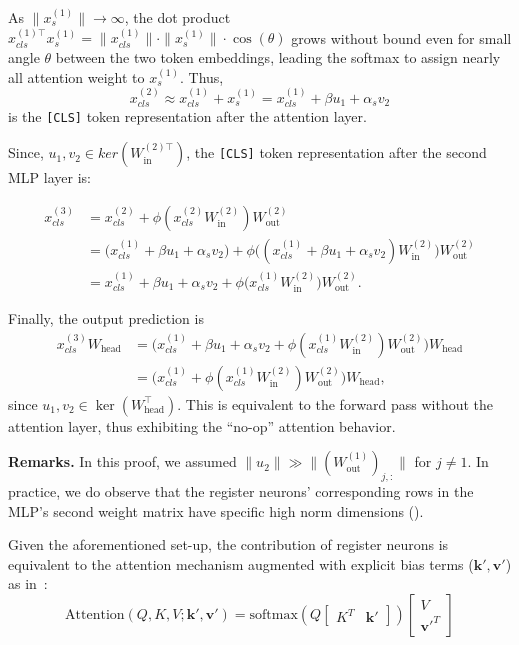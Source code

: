 \documentclass{article}
\begin{document}
As \( \|x^{(1)}_{s}\| \to \infty \), the dot product $x^{(1)\top}_{cls} x^{(1)}_{s} = \|x^{(1)}_{cls}\| \cdot \|x^{(1)}_{s}\| \cdot \cos(\theta)$
grows without bound even for small angle \( \theta \) between the two token embeddings, leading the softmax to assign nearly all attention weight to \( x^{(1)}_{s} \). Thus, 
\begin{equation}
    x^{(2)}_{cls} \approx x^{(1)}_{cls} + x^{(1)}_{s} = x^{(1)}_{cls} + \beta u_1+\alpha_sv_2
    \label{attention_eq}
\end{equation} is the \texttt{[CLS]} token representation after the attention layer. 


Since, $u_1, v_2 \in ker(W_{\text{in}}^{(2)\top})$, the \texttt{[CLS]} token representation after the second MLP layer is:

\begin{align}
    x^{(3)}_{cls} 
    &= x^{(2)}_{cls}+\phi\!\left(x^{(2)}_{cls}W_{\text{in}}^{(2)}\right)W_{\text{out}}^{(2)} \\
    &= \big(x^{(1)}_{cls} + \beta u_1+\alpha_sv_2\big) 
       + \phi \big((x^{(1)}_{cls} + \beta u_1+\alpha_sv_2)W_{\text{in}}^{(2)}\big)W_{\text{out}}^{(2)} \\
    &= x^{(1)}_{cls} + \beta u_1+\alpha_sv_2 
       + \phi \big(x^{(1)}_{cls}W_{\text{in}}^{(2)}\big)W_{\text{out}}^{(2)}.
\end{align}

Finally, the output prediction is
\begin{align}
    x^{(3)}_{cls}W_{\text{head}} 
    &= \big(x^{(1)}_{cls} + \beta u_1 + \alpha_s v_2 
       + \phi (x^{(1)}_{cls}W_{\text{in}}^{(2)})W_{\text{out}}^{(2)}\big) W_{\text{head}} \\
    &= \big(x^{(1)}_{cls} 
       + \phi (x^{(1)}_{cls}W_{\text{in}}^{(2)})W_{\text{out}}^{(2)}\big) W_{\text{head}},
\end{align}
since $u_1, v_2 \in \ker(W^\top_{\text{head}})$. 
This is equivalent to the forward pass without the attention layer, 
thus exhibiting the ``no-op'' attention behavior.

\textbf{Remarks.} In this proof, we assumed $\|u_2\|
 \gg\|(W_{\text{out}}^{(1)})_{j,:}\|$ for $j \neq 1$. In practice, we do observe that the register neurons' corresponding rows in the MLP's second weight matrix have specific high norm dimensions ().


\renewcommand\thecorollary{1} %
\begin{corollary}
\label{corollary:register_bias}
Given the aforementioned set-up, the contribution of register neurons is equivalent to the attention mechanism augmented with explicit bias terms  ($\mathbf{k}', \mathbf{v}'$) as in~\cite{sunmassive}: $$\text{Attention}(Q, K, V; \mathbf{k}', \mathbf{v}') = \text{softmax}\left( Q \begin{bmatrix} K^T & \mathbf{k}' \end{bmatrix} \right) \begin{bmatrix} V \\ \mathbf{v}'^T \end{bmatrix}$$ 
\end{corollary}
\end{document}

